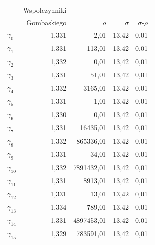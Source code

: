 \documentclass{my_pracamgr}
\begin{document}
\begin{center}
  \begin{tabular}{lrrrr}
    & Wspolczynniki \\
    & Gombaskiego & $\rho$ & $\sigma$ & $\sigma$-$\rho$\\
    $\gamma_{0}$ & 1,331 & 2,01 & 13,42 & 0,01 \\
    $\gamma_{1}$ & 1,331 & 113,01 & 13,42 & 0,01 \\
    $\gamma_{2}$ & 1,332 & 0,01 & 13,42 & 0,01 \\
    $\gamma_{3}$ & 1,331 & 51,01 & 13,42 & 0,01 \\
    $\gamma_{4}$ & 1,332 & 3165,01 & 13,42 & 0,01 \\
    $\gamma_{5}$ & 1,331 & 1,01 & 13,42 & 0,01 \\
    $\gamma_{6}$ & 1,330 & 0,01 & 13,42 & 0,01 \\
    $\gamma_{7}$ & 1,331 & 16435,01 & 13,42 & 0,01 \\
    $\gamma_{8}$ & 1,332 & 865336,01 & 13,42 & 0,01 \\
    $\gamma_{9}$ & 1,331 & 34,01 & 13,42 & 0,01 \\
    $\gamma_{10}$ & 1,332 & 7891432,01 & 13,42 & 0,01 \\
    $\gamma_{11}$ & 1,331 & 8913,01 & 13,42 & 0,01 \\
    $\gamma_{12}$ & 1,331 & 13,01 & 13,42 & 0,01 \\
    $\gamma_{13}$ & 1,334 & 789,01 & 13,42 & 0,01 \\
    $\gamma_{14}$ & 1,331 & 4897453,01 & 13,42 & 0,01 \\
    $\gamma_{15}$ & 1,329 & 783591,01 & 13,42 & 0,01 \\
  \end{tabular}
\end{center}


\end{document}
